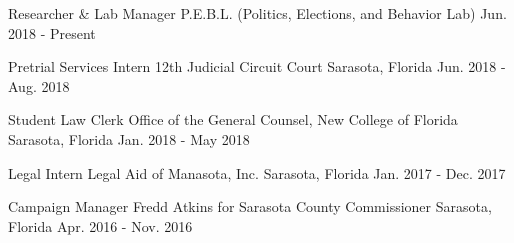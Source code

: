 

\begin{cventries}

  \cventry
    {Researcher \& Lab Manager} %
    {P.E.B.L. (Politics, Elections, and Behavior Lab)} %
    {Jun. 2018 - Present} %
    {} %
    {}


  \cventry
    {Pretrial Services Intern} %
    {12th Judicial Circuit Court} %
    {Sarasota, Florida} %
    {Jun. 2018 - Aug. 2018} %
    {}

  \cventry
    {Student Law Clerk} %
    {Office of the General Counsel, New College of Florida} %
    {Sarasota, Florida} %
    {Jan. 2018 - May 2018} %
    {}

  \cventry
    {Legal Intern} %
    {Legal Aid of Manasota, Inc.} %
    {Sarasota, Florida} %
    {Jan. 2017 - Dec. 2017} %
    {}

  \cventry
    {Campaign Manager} %
    {Fredd Atkins for Sarasota County Commissioner} %
    {Sarasota, Florida} %
    {Apr. 2016 - Nov. 2016} %
    {}

\end{cventries}
